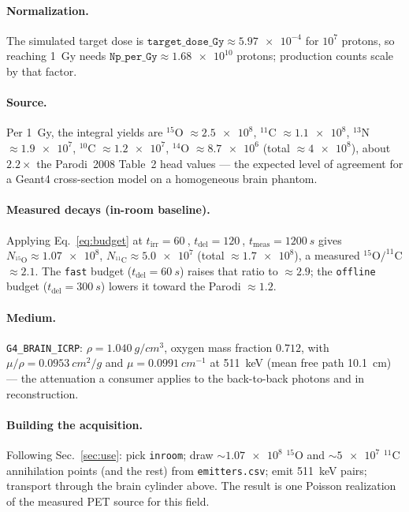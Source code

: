 \documentclass[11pt]{article}
\newcommand{\tirr}{t_{\mathrm{irr}}}
\newcommand{\tdel}{t_{\mathrm{del}}}
\newcommand{\tmeas}{t_{\mathrm{meas}}}
\newcommand{\file}[1]{\texttt{#1}}
\begin{document}
\paragraph{Normalization.} The simulated target dose is
$\file{target\_dose\_Gy}\approx\num{5.97e-4}$ for $10^{7}$ protons, so reaching
\SI{1}{Gy} needs $\file{Np\_per\_Gy}\approx\num{1.68e10}$ protons; production
counts scale by that factor.

\paragraph{Source.} Per \SI{1}{Gy}, the integral yields are
$^{15}$O $\approx\num{2.5e8}$, $^{11}$C $\approx\num{1.1e8}$,
$^{13}$N $\approx\num{1.9e7}$, $^{10}$C $\approx\num{1.2e7}$,
$^{14}$O $\approx\num{8.7e6}$ (total $\approx\num{4e8}$), about
$2.2\times$ the Parodi~2008 Table~2 head values --- the expected level of
agreement for a Geant4 cross-section model on a homogeneous brain phantom.

\paragraph{Measured decays (in-room baseline).} Applying Eq.~\eqref{eq:budget} at
$\tirr=\SI{60}{}$, $\tdel=\SI{120}{}$, $\tmeas=\SI{1200}{s}$ gives
$N_{^{15}\mathrm O}\approx\num{1.07e8}$, $N_{^{11}\mathrm C}\approx\num{5.0e7}$
(total $\approx\num{1.7e8}$), a measured $^{15}$O$/^{11}$C $\approx 2.1$. The
\file{fast} budget ($\tdel=\SI{60}{s}$) raises that ratio to $\approx 2.9$; the
\file{offline} budget ($\tdel=\SI{300}{s}$) lowers it toward the Parodi
$\approx1.2$.

\paragraph{Medium.} \file{G4\_BRAIN\_ICRP}: $\rho=\SI{1.040}{g/cm^3}$, oxygen
mass fraction $0.712$, with $\mu/\rho=\SI{0.0953}{cm^2/g}$ and
$\mu=\SI{0.0991}{cm^{-1}}$ at \SI{511}{keV} (mean free path \SI{10.1}{cm}) ---
the attenuation a consumer applies to the back-to-back photons and in
reconstruction.

\paragraph{Building the acquisition.} Following Sec.~\ref{sec:use}: pick
\file{inroom}; draw $\sim\num{1.07e8}$ $^{15}$O and $\sim\num{5e7}$ $^{11}$C
annihilation points (and the rest) from \file{emitters.csv}; emit \SI{511}{keV}
pairs; transport through the brain cylinder above. The result is one Poisson
realization of the measured PET source for this field.
\end{document}
